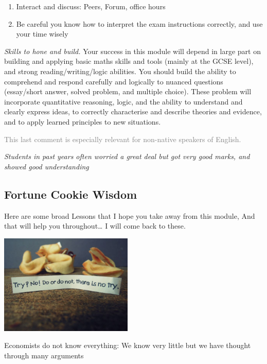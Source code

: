 \documentclass[]{article}
\begin{document}
\begin{enumerate}
\def\labelenumi{\arabic{enumi}.}
\setcounter{enumi}{2}
\item
  Interact and discuss: Peers, Forum, office hours
\item
  Be careful you know how to interpret the exam instructions correctly, and use your time wisely
\end{enumerate}

\emph{Skills to hone and build.} Your success in this module will depend in large part on building and applying basic maths skills and tools (mainly at the GCSE level), and strong reading/writing/logic abilities. You should build the ability to comprehend and respond carefully and logically to nuanced questions (essay/short answer, solved problem, and multiple choice). These problem will incorporate quantitative reasoning, logic, and the ability to understand and clearly express ideas, to correctly characterise and describe theories and evidence, and to apply learned principles to new situations.

\textcolor{gray}{This last comment is especially relevant for non-native speakers of English.}

\emph{Students in past years often worried a great deal but got very good marks, and showed good understanding}

\hypertarget{fortune-cookie-wisdom}{%
\subsection{Fortune Cookie Wisdom}\label{fortune-cookie-wisdom}}

Here are some broad Lessons that I hope you take away from this module, And that will help you throughout\ldots{} I will come back to these.

\includegraphics[width=2.5in]{picsfigs/fortunecookieyoda.jpg}

\textrm{Economists do not know everything: We know very little but we have thought through many arguments}
\end{document}
